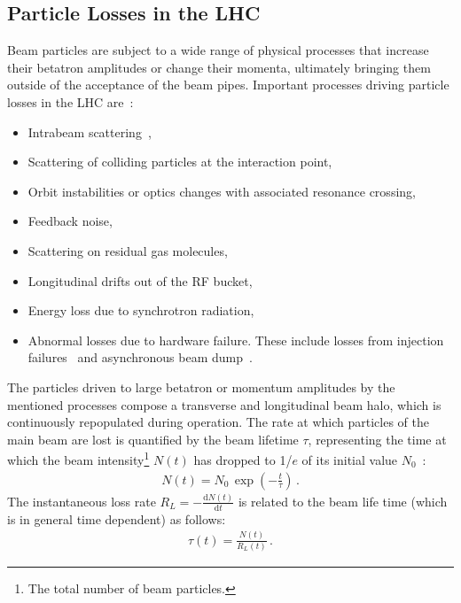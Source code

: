 %


\subsection{Particle Losses in the LHC}
Beam particles are subject to a wide range of physical processes that increase their betatron amplitudes or change their momenta, ultimately bringing them outside of the acceptance of the beam pipes. Important processes driving particle losses in the LHC are~\cite{LHC:PROJ:NOTE:375}:
\begin{itemize}
\item Intrabeam scattering~\cite{ICHEA:PIWINSKI,PartACC13115}, 
\item Scattering of colliding particles at the interaction point,
\item Orbit instabilities or optics changes with associated resonance crossing, 
\item Feedback noise,
\item Scattering on residual gas molecules,
\item Longitudinal drifts out of the RF bucket,
\item Energy loss due to synchrotron radiation,
\item Abnormal losses due to hardware failure. These include losses from injection failures~\cite{LHC:PROJ:REPORT:1053} and asynchronous beam dump~\cite{projectnote293}.
\end{itemize}
%
The particles driven to large betatron or momentum amplitudes by the mentioned processes compose a transverse and longitudinal beam halo, which is continuously repopulated during operation. The rate at which particles of the main beam are lost is quantified by the beam lifetime $\tau$, representing the time at which the beam intensity\footnote{The total number of beam particles.} $N(t)$ has dropped to 1/$e$ of its initial value $N_0$~\citedr:
%
\begin{align}
   N(t) = N_0 \, \exp \left( - \frac{t}{\tau} \right) \, .
\end{align}
%
The instantaneous loss rate $R_L = -\frac{\mathrm{d} N(t)}{\mathrm{d}t}$ is related to the beam life time (which is in general time dependent) as follows:
%
\begin{align}
  \tau(t) = \frac{N(t)}{R_L(t)} \, . \label{eq:taudef}
\end{align}
%


%
%

